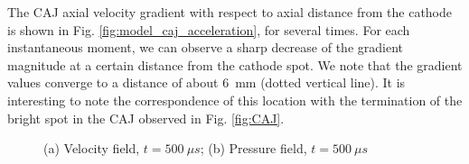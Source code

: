 \documentclass[a4paper]{iacas}%
\begin{document}
The CAJ axial velocity gradient with respect to axial distance from the cathode is shown in Fig. \ref{fig:model_caj_acceleration}, for several times. For each instantaneous moment, we can observe a sharp decrease of the gradient magnitude at a certain distance from the cathode spot. We note that the gradient values converge to a distance of about 6~mm (dotted vertical line). It is interesting to note the correspondence of this location with the termination of the bright spot in the CAJ observed in Fig. \ref{fig:CAJ}.
\begin{figure}
	\centering
	
	
	\caption{(a) Velocity field, $ t = 500~\mu s $; (b) Pressure field, $ t = 500~\mu s $}
\end{figure}
\end{document}
